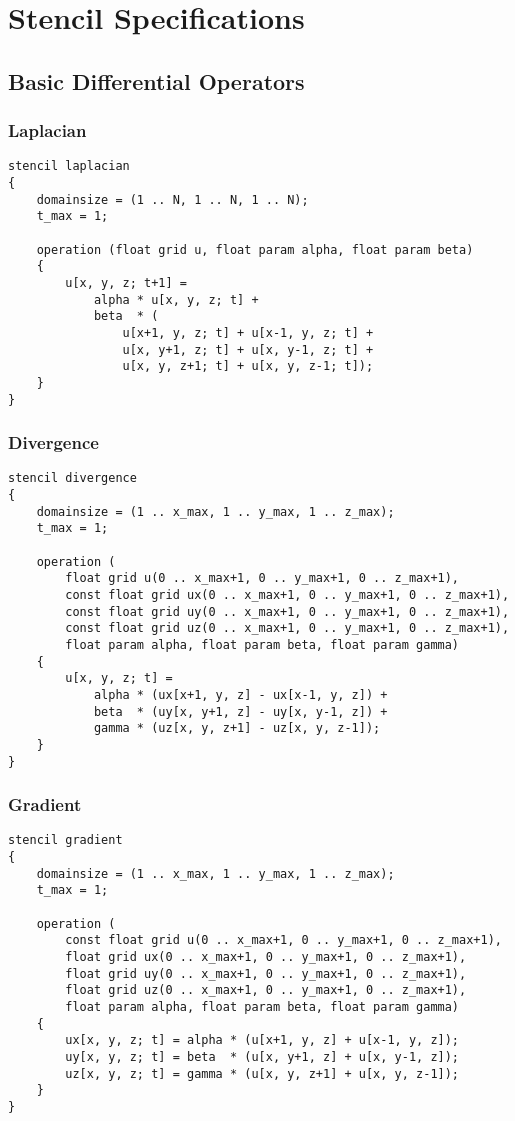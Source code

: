 \chapter{Stencil Specifications}
\label{sec:appendix_stencils}

\section{Basic Differential Operators}

\subsection{Laplacian}
\begin{lstlisting}[language=stencil]
stencil laplacian
{
	domainsize = (1 .. N, 1 .. N, 1 .. N);
	t_max = 1;
	
	operation (float grid u, float param alpha, float param beta)
	{
		u[x, y, z; t+1] =
			alpha * u[x, y, z; t] +
			beta  * (
				u[x+1, y, z; t] + u[x-1, y, z; t] +
				u[x, y+1, z; t] + u[x, y-1, z; t] +
				u[x, y, z+1; t] + u[x, y, z-1; t]); 
	}
}
\end{lstlisting}

\subsection{Divergence}
\begin{lstlisting}[language=stencil]
stencil divergence
{
	domainsize = (1 .. x_max, 1 .. y_max, 1 .. z_max);
	t_max = 1;

	operation (
		float grid u(0 .. x_max+1, 0 .. y_max+1, 0 .. z_max+1),
		const float grid ux(0 .. x_max+1, 0 .. y_max+1, 0 .. z_max+1),
		const float grid uy(0 .. x_max+1, 0 .. y_max+1, 0 .. z_max+1),
		const float grid uz(0 .. x_max+1, 0 .. y_max+1, 0 .. z_max+1),
		float param alpha, float param beta, float param gamma)
	{
		u[x, y, z; t] =
			alpha * (ux[x+1, y, z] - ux[x-1, y, z]) +
			beta  * (uy[x, y+1, z] - uy[x, y-1, z]) +
			gamma * (uz[x, y, z+1] - uz[x, y, z-1]);
	}
}
\end{lstlisting}

\subsection{Gradient}
\begin{lstlisting}[language=stencil]
stencil gradient
{
	domainsize = (1 .. x_max, 1 .. y_max, 1 .. z_max);
	t_max = 1;

	operation (
		const float grid u(0 .. x_max+1, 0 .. y_max+1, 0 .. z_max+1),
		float grid ux(0 .. x_max+1, 0 .. y_max+1, 0 .. z_max+1),
		float grid uy(0 .. x_max+1, 0 .. y_max+1, 0 .. z_max+1),
		float grid uz(0 .. x_max+1, 0 .. y_max+1, 0 .. z_max+1),
		float param alpha, float param beta, float param gamma)
	{
		ux[x, y, z; t] = alpha * (u[x+1, y, z] + u[x-1, y, z]);
		uy[x, y, z; t] = beta  * (u[x, y+1, z] + u[x, y-1, z]);
		uz[x, y, z; t] = gamma * (u[x, y, z+1] + u[x, y, z-1]);
	}
}
\end{lstlisting}


